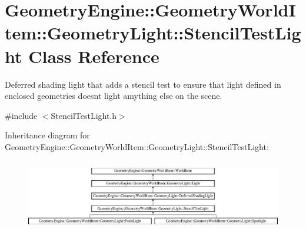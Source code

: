 \hypertarget{class_geometry_engine_1_1_geometry_world_item_1_1_geometry_light_1_1_stencil_test_light}{}\section{Geometry\+Engine\+::Geometry\+World\+Item\+::Geometry\+Light\+::Stencil\+Test\+Light Class Reference}
\label{class_geometry_engine_1_1_geometry_world_item_1_1_geometry_light_1_1_stencil_test_light}


Deferred shading light that adds a stencil test to ensure that light defined in enclosed geometries doesn\textquotesingle{}t light amything else on the scene.  




{\ttfamily \#include $<$Stencil\+Test\+Light.\+h$>$}

Inheritance diagram for Geometry\+Engine\+::Geometry\+World\+Item\+::Geometry\+Light\+::Stencil\+Test\+Light\+:\begin{figure}[H]
\begin{center}
\leavevmode
\includegraphics[height=3.146068cm]{class_geometry_engine_1_1_geometry_world_item_1_1_geometry_light_1_1_stencil_test_light}
\end{center}
\end{figure}
